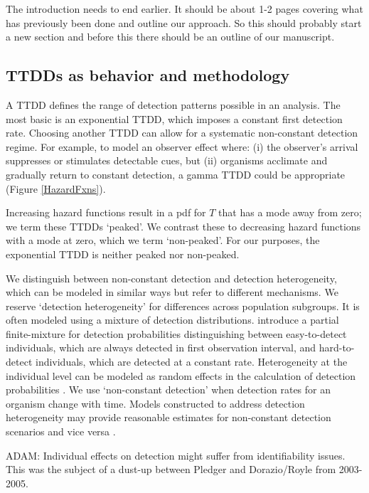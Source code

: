 \documentclass[useAMS,usenatbib,referee,12pt]{article}
\newcommand{\adam}[1]{{\color{blue} ADAM: #1}}
\newcommand{\jarad}[1]{{\color{Orange} #1}}
\begin{document}
\jarad{The introduction needs to end earlier. It should be about 1-2 pages covering what has previously been done and outline our approach. So this should probably start a new section and before this there should be an outline of our manuscript. }

\subsection{TTDDs as behavior and methodology}

A TTDD defines the range of detection patterns possible in an analysis.  
The most basic is an exponential TTDD, which imposes a constant first detection rate.  
Choosing another TTDD can allow for a systematic non-constant detection regime.  
For example, to model an observer effect where: (i) the observer's arrival suppresses or stimulates detectable cues, but (ii) organisms acclimate and gradually return to constant detection, a gamma TTDD could be appropriate (Figure \ref{HazardFxns}).

Increasing hazard functions result in a pdf for $T$ that has a mode away from zero; we term these TTDDs `peaked'.  
We contrast these to decreasing hazard functions with a mode at zero, which we term `non-peaked'.  
For our purposes, the exponential TTDD is neither peaked nor non-peaked.

We distinguish between non-constant detection and detection heterogeneity, which can be modeled in similar ways but refer to different mechanisms.  
We reserve `detection heterogeneity' for differences across population subgroups.  
It is often modeled using a mixture of detection distributions.  
\citet{Farnsworth2002} introduce a partial finite-mixture for detection probabilities distinguishing between easy-to-detect individuals, which are always detected in first observation interval, and hard-to-detect individuals, which are detected at a constant rate.  
 Heterogeneity at the individual level can be modeled as random effects in the calculation of detection probabilities \citep{DorazioRoyle2003, Mantyniemi2005}.  
We use `non-constant detection' when detection rates for an organism change with time.  
Models constructed to address detection heterogeneity may provide reasonable estimates for non-constant detection scenarios and vice versa \citep{Mantyniemi2005}.

\adam{Individual effects on detection might suffer from identifiability issues. This was the subject of a dust-up between Pledger and Dorazio/Royle from 2003-2005.}
\end{document}
